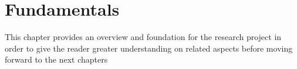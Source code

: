 \chapter{Fundamentals}
This chapter provides an overview and foundation for the research project in order to give the reader greater understanding on related aspects before moving forward to the next chapters


